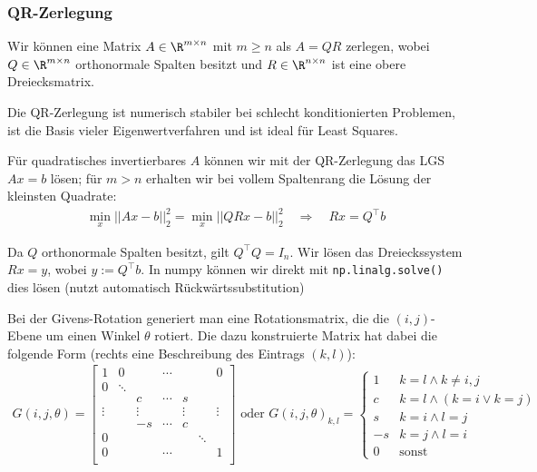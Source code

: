 \subsubsection{QR-Zerlegung}
Wir können eine Matrix $A \in \R^{m \times n}$ mit $m \geq n$ als $A = QR$ zerlegen, wobei $Q \in \R^{m \times n}$
orthonormale Spalten besitzt und $R \in \R^{n \times n}$ ist eine obere Dreiecksmatrix.

Die QR-Zerlegung ist numerisch stabiler bei schlecht konditionierten Problemen, ist die Basis vieler Eigenwertverfahren und ist ideal für Least Squares.

Für quadratisches invertierbares $A$ können wir mit der QR-Zerlegung das LGS $Ax=b$ lösen; für $m>n$ erhalten wir bei vollem Spaltenrang die Lösung der kleinsten Quadrate:
\rmvspace
\begin{align*}
    \min_x||Ax-b||_2^2 = \min_x||QRx-b||_2^2
    \quad\Longrightarrow\quad Rx=Q^\top b
\end{align*}

Da $Q$ orthonormale Spalten besitzt, gilt $Q^\top Q=I_n$.
Wir lösen das Dreieckssystem $Rx = y$, wobei $y := Q^\top b$.
In numpy können wir direkt mit \texttt{np.linalg.solve()} dies lösen (nutzt automatisch Rückwärtssubstitution)


\newpage
{}

Bei der Givens-Rotation generiert man eine Rotationsmatrix, die die $(i, j)$-Ebene um einen Winkel $\theta$ rotiert.
Die dazu konstruierte Matrix hat dabei die folgende Form (rechts eine Beschreibung des Eintrags $(k, l)$):
\rmvspace
\begin{align*}
    G(i, j, \theta) =
    \begin{bmatrix}
        1      & 0      &        & \cdots &        &        & 0      \\
        0      & \ddots &        &        &        &        &        \\
               &        & c      & \cdots & s      &        &        \\
        \vdots &        & \vdots &        & \vdots &        & \vdots \\
               &        & -s     & \cdots & c      &        &        \\
        0      &        &        &        &        & \ddots &        \\
        0      &        &        & \cdots &        &        & 1      \\
    \end{bmatrix}
    \text{ oder }
    G(i, j, \theta)_{k, l} =
    \begin{cases}
        1  & k = l \land k \neq i,j         \\
        c  & k = l \land (k = i \lor k = j) \\
        s  & k = i \land l = j              \\
        -s & k = j \land l = i              \\
        0  & \text{sonst}
    \end{cases}
\end{align*}

